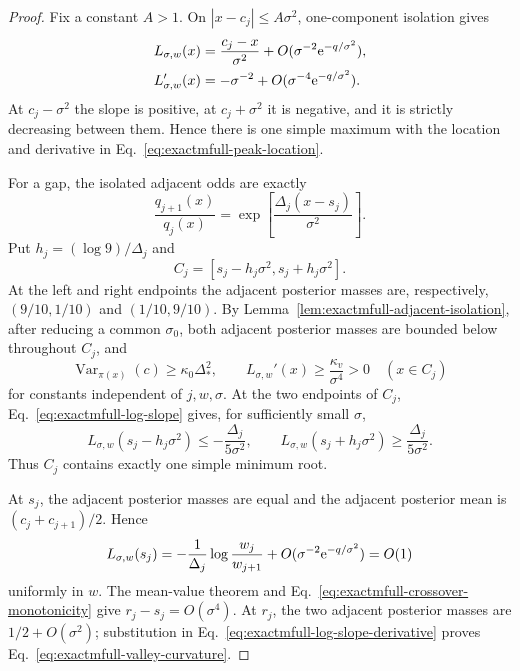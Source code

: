 \begin{proof}
Fix a constant \(A>1\).  On
\(|x-c_j|\le A\sigma^2\), one-component isolation gives
\begin{align}
 L_{\sigma,w}(x)
 &=\frac{c_j-x}{\sigma^2}
   +O(\sigma^{-2}\mathrm e^{-q/\sigma^2}),
 \label{eq:exactmfull-peak-slope-expansion}\\
 L_{\sigma,w}'(x)
 &=-\sigma^{-2}
   +O(\sigma^{-4}\mathrm e^{-q/\sigma^2}).
 \label{eq:exactmfull-peak-derivative-expansion}
\end{align}
At \(c_j-\sigma^2\) the slope is positive, at
\(c_j+\sigma^2\) it is negative, and it is strictly decreasing between
them.  Hence there is one simple maximum with the location and derivative in
Eq.~\eqref{eq:exactmfull-peak-location}.

For a gap, the isolated adjacent odds are exactly
\begin{equation}
 \frac{q_{j+1}(x)}{q_j(x)}
 =\exp\!\left[\frac{\Delta_j(x-s_j)}{\sigma^2}\right].
 \label{eq:exactmfull-adjacent-odds}
\end{equation}
Put \(h_j=(\log9)/\Delta_j\) and
\begin{equation}
 C_j=[s_j-h_j\sigma^2,s_j+h_j\sigma^2].
 \label{eq:exactmfull-crossover-interval}
\end{equation}
At the left and right endpoints the adjacent posterior masses are,
respectively, \((9/10,1/10)\) and \((1/10,9/10)\).  By
Lemma~\ref{lem:exactmfull-adjacent-isolation}, after reducing a common
\(\sigma_0\), both adjacent posterior masses are bounded below throughout
\(C_j\), and
\begin{equation}
 \operatorname{Var}_{\pi(x)}(c)\ge\kappa_0\Delta_*^2,
 \qquad
 L_{\sigma,w}'(x)\ge\frac{\kappa_v}{\sigma^4}>0
 \quad(x\in C_j)
 \label{eq:exactmfull-crossover-monotonicity}
\end{equation}
for constants independent of \(j,w,\sigma\).  At the two endpoints of
\(C_j\), Eq.~\eqref{eq:exactmfull-log-slope} gives, for sufficiently small
\(\sigma\),
\begin{equation}
 L_{\sigma,w}(s_j-h_j\sigma^2)
 \le-\frac{\Delta_j}{5\sigma^2},
 \qquad
 L_{\sigma,w}(s_j+h_j\sigma^2)
 \ge \frac{\Delta_j}{5\sigma^2}.
 \label{eq:exactmfull-crossover-signs}
\end{equation}
Thus \(C_j\) contains exactly one simple minimum root.

At \(s_j\), the adjacent posterior masses are equal and the adjacent
posterior mean is \((c_j+c_{j+1})/2\).  Hence
\begin{equation}
 L_{\sigma,w}(s_j)
 =-\frac{1}{\Delta_j}\log\frac{w_j}{w_{j+1}}
 +O(\sigma^{-2}\mathrm e^{-q/\sigma^2})=O(1)
 \label{eq:exactmfull-slope-at-crossover}
\end{equation}
uniformly in \(w\).  The mean-value theorem and
Eq.~\eqref{eq:exactmfull-crossover-monotonicity} give
\(r_j-s_j=O(\sigma^4)\).  At \(r_j\), the two adjacent posterior masses are
\(1/2+O(\sigma^2)\); substitution in
Eq.~\eqref{eq:exactmfull-log-slope-derivative} proves
Eq.~\eqref{eq:exactmfull-valley-curvature}.


\end{proof}
